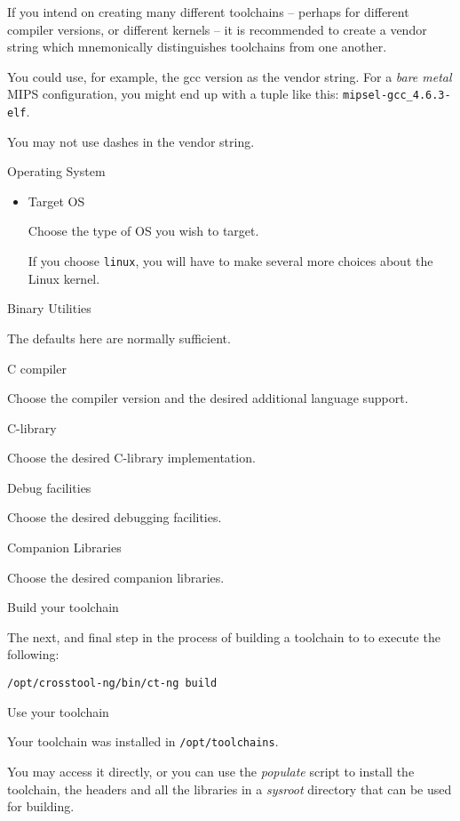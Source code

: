\begin{description}
\begin{description}
\begin{itemize}
        If you intend on creating many different toolchains -- perhaps
        for different compiler versions, or different kernels -- it is
        recommended to create a vendor string which mnemonically
        distinguishes toolchains from one another.

        You could use, for example, the gcc version as the vendor
        string.  For a \emph{bare metal} MIPS configuration, you might
        end up with a tuple like this: \texttt{mipsel-gcc\_4.6.3-elf}.

        You may not use dashes in the vendor string.
      \end{itemize}

    \item{Operating System}
      \begin{itemize}
      \item{Target OS}

        Choose the type of OS you wish to target.

        If you choose \texttt{linux}, you will have to make several
        more choices about the Linux kernel.
      \end{itemize}

    \item{Binary Utilities}

      The defaults here are normally sufficient.

    \item{C compiler}

      Choose the compiler version and the desired additional language
      support.

    \item{C-library}

      Choose the desired C-library implementation.

    \item{Debug facilities}

      Choose the desired debugging facilities.

    \item{Companion Libraries}

      Choose the desired companion libraries.
    \end{description}
  \item Build your toolchain

    The next, and final step in the process of building a toolchain to
    to execute the following:

\begin{verbatim}
/opt/crosstool-ng/bin/ct-ng build
\end{verbatim}

   \item Use your toolchain

     Your toolchain was installed in \texttt{/opt/toolchains}.

     You may access it directly, or you can use the \emph{populate}
     script to install the toolchain, the headers and all the
     libraries in a \emph{sysroot} directory that can be used for
     building.

\end{description}
